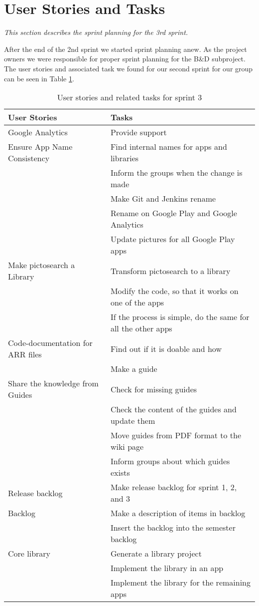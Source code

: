 \section{User Stories and Tasks} \label{Sprint3_SecUserStoriesAndTasks}
\textit{This section describes the sprint planning for the 3rd sprint.}

After the end of the 2nd sprint we started sprint planning anew. As the project owners we were responsible for proper sprint planning for the B\&D subproject. The user stories and associated task we found for our second sprint for our group can be seen in Table \ref{Sprint3_UserStories3_table}.

\begin{table}[H]
	\centering
	\begin{tabular}{ll}
		\textbf{User Stories} & \textbf{Tasks}\\ \hline \noalign{\vskip 2mm}
		Google Analytics & Provide support\\ \hline
		Ensure App Name Consistency & Find internal names for apps and libraries \\
		& Inform the groups when the change is made\\
		& Make Git and Jenkins rename \\
		& Rename on Google Play and Google Analytics \\
		& Update pictures for all Google Play apps\\ \hline
		Make pictosearch a Library & Transform pictosearch to a library \\
		& Modify the code, so that it works on one of the apps \\
		& If the process is simple, do the same for all the other apps \\ \hline
		Code-documentation for ARR files & Find out if it is doable and how \\
		& Make a guide \\ \hline
		Share the knowledge from Guides & Check for missing guides \\
		& Check the content of the guides and update them \\
		& Move guides from PDF format to the wiki page \\
		& Inform groups about which guides exists \\ \hline
		Release backlog & Make release backlog for sprint 1, 2, and 3 \\
		Backlog & Make a description of items in backlog \\
		& Insert the backlog into the semester backlog \\ \hline
		Core library & Generate a library project \\
		& Implement the library in an app \\
		& Implement the library for the remaining apps \\ \hline
	\end{tabular}
	\caption{User stories and related tasks for sprint 3}
	\label{Sprint3_UserStories3_table}
\end{table}
